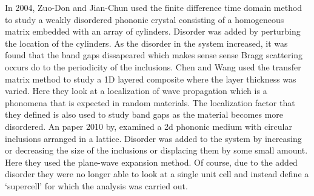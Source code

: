 \documentclass{article}
\begin{document}
In 2004, Zuo-Don and Jian-Chun used the finite difference time domain method to 
study a weakly disordered phononic crystal consisting of a homogeneous matrix 
embedded with an array of cylinders. Disorder was added by perturbing the 
location of the cylinders. As the disorder in the system increased, it was 
found that the band gaps dissapeared which makes sense sense Bragg scattering 
occurs do to the periodicity of the inclusions. Chen and Wang used the transfer 
matrix method to study a 1D layered composite where the layer thickness was 
varied. Here they look at a localization of wave propagation which is a 
phonomena that is expected in random materials. The localization factor that 
they defined is also used to study band gaps as the material becomes more 
disordered. An paper 2010 by, examined a 2d phononic medium with circular 
inclusions arranged in a lattice. Disorder was added to the system by 
increasing or decreasing the size of the inclusions or displacing them by some 
small amount. Here they used the plane-wave expansion method. Of course, due to 
the added disorder they were no longer able to look at a single unit cell and 
instead define a `supercell' for which the analysis was carried out. 


\end{document}
